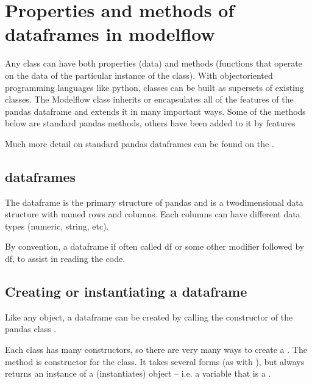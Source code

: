 \documentclass[letterpaper,10pt,english]{jupyterBook}
\begin{document}
\section{Properties and methods of dataframes in modelflow}
\label{\detokenize{content/04_PythonEssentials/PythonPandasDataframes:properties-and-methods-of-dataframes-in-modelflow}}
\sphinxAtStartPar
Any class can have both properties (data) and methods (functions that operate on the data of the particular instance of the class). With object\sphinxhyphen{}oriented programming languages like python, classes can be built as supersets of existing classes. The Modelflow class  inherits or encapsulates all of the features of the pandas dataframe and extends it in many important ways.  Some of the methods below are standard pandas methods, others have been added to it by  features

\sphinxAtStartPar
Much more detail on standard pandas dataframes can be found on the .


\subsection{dataframes}
\label{\detokenize{content/04_PythonEssentials/PythonPandasDataframes:dataframes}}
\sphinxAtStartPar
The dataframe is the primary structure of pandas and is a two\sphinxhyphen{}dimensional data structure with named rows and columns.  Each columns can have different data types (numeric, string, etc).

\sphinxAtStartPar
By convention, a dataframe if often called df or some other modifier followed by df, to assist in reading the code.


\subsection{Creating or instantiating a dataframe}
\label{\detokenize{content/04_PythonEssentials/PythonPandasDataframes:creating-or-instantiating-a-dataframe}}
\sphinxAtStartPar
Like any object, a dataframe can be created by calling the constructor of the pandas class .

\sphinxAtStartPar
Each class has many constructors, so there are very many ways to create a . The  method is constructor for the  class. It takes several forms (as with ), but always returns an instance of a (instantiates)  object – i.e. a variable that is a .
\end{document}
